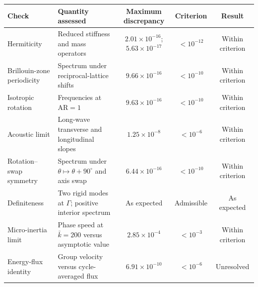 \begin{tabularx}{\textwidth}{@{}l Y c c c@{}}
\toprule
Check & Quantity assessed & Maximum discrepancy & Criterion & Result \\
\midrule
Hermiticity & Reduced stiffness and mass operators & $2.01\times10^{-16}$; $5.63\times10^{-17}$ & $<10^{-12}$ & Within criterion \\
Brillouin-zone periodicity & Spectrum under reciprocal-lattice shifts & $9.66\times10^{-16}$ & $<10^{-10}$ & Within criterion \\
Isotropic rotation & Frequencies at $\mathrm{AR}=1$ & $9.63\times10^{-16}$ & $<10^{-10}$ & Within criterion \\
Acoustic limit & Long-wave transverse and longitudinal slopes & $1.25\times10^{-8}$ & $<10^{-6}$ & Within criterion \\
Rotation--swap symmetry & Spectrum under $\theta\mapsto\theta+90^\circ$ and axis swap & $6.44\times10^{-16}$ & $<10^{-10}$ & Within criterion \\
Definiteness & Two rigid modes at $\Gamma$; positive interior spectrum & As expected & Admissible & As expected \\
Micro-inertia limit & Phase speed at $\bar{k}=200$ versus asymptotic value & $2.85\times10^{-4}$ & $<10^{-3}$ & Within criterion \\
Energy-flux identity & Group velocity versus cycle-averaged flux & $6.91\times10^{-10}$ & $<10^{-6}$ & Unresolved \\
\bottomrule
\end{tabularx}
